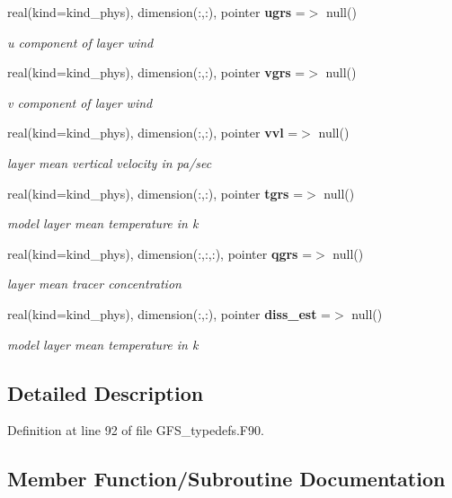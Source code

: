 \begin{DoxyCompactItemize}
real(kind=kind\+\_\+phys), dimension(\+:,\+:), pointer \textbf{ ugrs} =$>$ null()
\begin{DoxyCompactList}\small\item\em u component of layer wind \end{DoxyCompactList}\item 
real(kind=kind\+\_\+phys), dimension(\+:,\+:), pointer \textbf{ vgrs} =$>$ null()
\begin{DoxyCompactList}\small\item\em v component of layer wind \end{DoxyCompactList}\item 
real(kind=kind\+\_\+phys), dimension(\+:,\+:), pointer \textbf{ vvl} =$>$ null()
\begin{DoxyCompactList}\small\item\em layer mean vertical velocity in pa/sec \end{DoxyCompactList}\item 
real(kind=kind\+\_\+phys), dimension(\+:,\+:), pointer \textbf{ tgrs} =$>$ null()
\begin{DoxyCompactList}\small\item\em model layer mean temperature in k \end{DoxyCompactList}\item 
real(kind=kind\+\_\+phys), dimension(\+:,\+:,\+:), pointer \textbf{ qgrs} =$>$ null()
\begin{DoxyCompactList}\small\item\em layer mean tracer concentration \end{DoxyCompactList}\item 
real(kind=kind\+\_\+phys), dimension(\+:,\+:), pointer \textbf{ diss\+\_\+est} =$>$ null()
\begin{DoxyCompactList}\small\item\em model layer mean temperature in k \end{DoxyCompactList}\end{DoxyCompactItemize}


\subsection{Detailed Description}


Definition at line 92 of file G\+F\+S\+\_\+typedefs.\+F90.



\subsection{Member Function/\+Subroutine Documentation}
\mbox{\label{structgfs__typedefs_1_1gfs__statein__type_a75788fa90be0a5d03754e6ca7dfc62a0}} 
